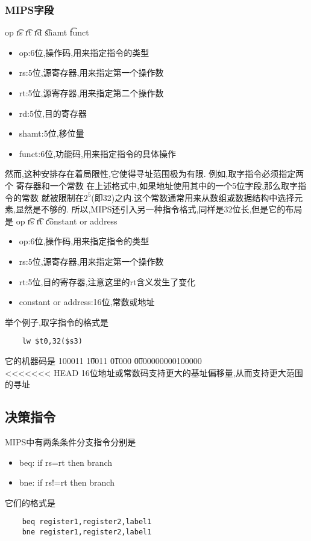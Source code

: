 \subsubsection{MIPS字段}
op \t rs \t rt \t rd \t shamt \t funct \\
\begin{itemize}
    \item op:6位,操作码,用来指定指令的类型
    \item rs:5位,源寄存器,用来指定第一个操作数
    \item rt:5位,源寄存器,用来指定第二个操作数
    \item rd:5位,目的寄存器
    \item shamt:5位,移位量
    \item funct:6位,功能码,用来指定指令的具体操作
\end{itemize}
然而,这种安排存在着局限性,它使得寻址范围极为有限.
例如,取字指令必须指定两个
寄存器和一个常数 在上述格式中,如果地址使用其中的一个5位字段,那么取字指令的常数
就被限制在$2^5$(即32)之内.这个常数通常用来从数组或数据结构中选择元素,显然是不够的.
所以,MIPS还引入另一种指令格式,同样是32位长,但是它的布局是
op \t rs \t rt \t constant or address \\
\begin{itemize}
    \item op:6位,操作码,用来指定指令的类型
    \item rs:5位,源寄存器,用来指定第一个操作数
    \item rt:5位,目的寄存器,注意这里的rt含义发生了变化
    \item constant or address:16位,常数或地址
\end{itemize}
举个例子,取字指令的格式是
\begin{lstlisting}
    lw $t0,32($s3)
\end{lstlisting}
它的机器码是
100011 \t 10011 \t 01000 \t 0000000000100000 \\
<<<<<<< HEAD
16位地址或常数码支持更大的基址偏移量,从而支持更大范围的寻址\\
\subsection{决策指令}
MIPS中有两条条件分支指令分别是
\begin{itemize}
    \item beq: if rs=rt then branch
    \item bne: if rs!=rt then branch
\end{itemize}
它们的格式是
\begin{lstlisting}
    beq register1,register2,label1
    bne register1,register2,label1
\end{lstlisting}

